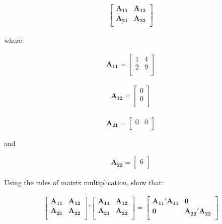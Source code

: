 \documentclass[12pt]{article}
\begin{document}
\begin{eqnarray*}
\begin{bmatrix} 
\mathbf{A_{11}} & \mathbf{A_{12}}  \\
\mathbf{A_{21}} & \mathbf{A_{22}}  \\
\end{bmatrix}
\end{eqnarray*}

where:

\begin{eqnarray*}
\mathbf{A_{11}}=
\begin{bmatrix} 
1& 4 \\
2 & 9 \\
\end{bmatrix}
\end{eqnarray*}

\begin{eqnarray*}
\mathbf{A_{12}}=
\begin{bmatrix} 
0\\
0\\
\end{bmatrix}
\end{eqnarray*}

\begin{eqnarray*}
\mathbf{A_{21}}=
\begin{bmatrix} 
0 & 0\\
\end{bmatrix}
\end{eqnarray*}

and


\begin{eqnarray*}
\mathbf{A_{22}}=
\begin{bmatrix} 
6\\
\end{bmatrix}
\end{eqnarray*}

Using the rules of matrix multiplication, show that:

\begin{eqnarray*}
\begin{bmatrix} 
\mathbf{A_{11}} & \mathbf{A_{12}}  \\
\mathbf{A_{21}} & \mathbf{A_{22}}  \\
\end{bmatrix}'
\begin{bmatrix} 
\mathbf{A_{11}} & \mathbf{A_{12}}  \\
\mathbf{A_{21}} & \mathbf{A_{22}}  \\
\end{bmatrix} = 
\begin{bmatrix} 
\mathbf{A_{11}' A_{11}} & \mathbf{0} \\
\mathbf{0}& \mathbf{A_{22}'A_{22}}  \\
\end{bmatrix} 
\end{eqnarray*}
\end{document}
